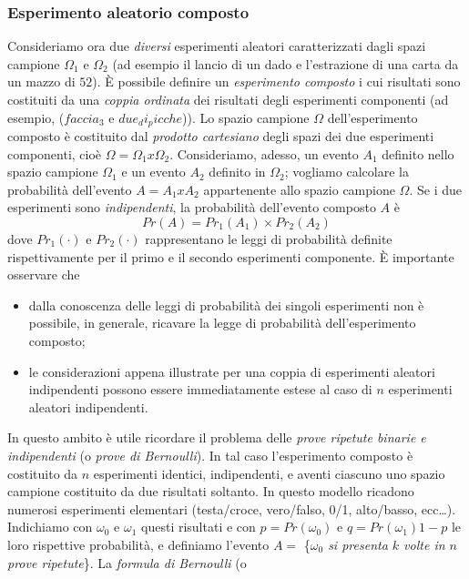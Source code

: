 \documentclass[12pt,oneside,openany]{memoir}
\numberwithin{equation}{subsection}
\begin{document}
\subsubsection{Esperimento aleatorio composto}
Consideriamo ora due \textit{diversi} esperimenti aleatori caratterizzati dagli
spazi campione $\Omega_1$ e $\Omega_2$ (ad esempio il lancio di un dado e
l'estrazione di una carta da un mazzo di $52$). \`E possibile definire un
\textit{esperimento composto} i cui risultati sono costituiti da una
\textit{coppia ordinata} dei risultati degli esperimenti componenti (ad esempio,
($faccia_3$ e $due_di_picche$)). Lo spazio campione $\Omega$ dell'esperimento
composto \`e costituito dal \textit{prodotto cartesiano} degli spazi dei due
esperimenti componenti, cio\`e $\Omega = \Omega_1 x \Omega_2$. Consideriamo,
adesso, un evento $A_1$ definito nello spazio campione $\Omega_1$ e un evento
$A_2$ definito in $\Omega_2$; vogliamo calcolare la probabilit\`a dell'evento
$A = A_1 x A_2$ appartenente allo spazio campione $\Omega$. Se i due esperimenti
sono \textit{indipendenti}, la probabilit\`a dell'evento composto $A$ \`e
\[
    Pr(A) = Pr_1(A_1) \times Pr_2(A_2)
\]
dove $Pr_1(\cdot)$ e $Pr_2(\cdot)$ rappresentano le leggi di probabilit\`a
definite rispettivamente per il primo e il secondo esperimenti componente. \`E
importante osservare che
\begin{itemize}
    \item dalla conoscenza delle leggi di probabilit\`a dei singoli esperimenti
        non \`e possibile, in generale, ricavare la legge di probabilit\`a
        dell'esperimento composto;
    \item le considerazioni appena illustrate per una coppia di esperimenti
        aleatori indipendenti possono essere immediatamente estese al caso di
        $n$ esperimenti aleatori indipendenti.
\end{itemize}
In questo ambito \`e utile ricordare il problema delle \textit{prove ripetute
binarie e indipendenti} (o \textit{prove di Bernoulli}). In tal caso
l'esperimento composto \`e costituito da $n$ esperimenti identici, indipendenti,
e aventi ciascuno uno spazio campione costituito da due risultati soltanto. In
questo modello ricadono numerosi esperimenti elementari (testa/croce,
vero/falso, 0/1, alto/basso, ecc\dots). Indichiamo con $\omega_0$ e $\omega_1$
questi risultati e con $p = Pr(\omega_0)$ e $q = Pr(\omega_1) 1 - p$ le loro
rispettive probabilit\`a, e definiamo l'evento $A =$ \{\textit{$\omega_0$ si
presenta $k$ volte in $n$ prove ripetute}\}. La \textit{formula di Bernoulli} (o
\end{document}
